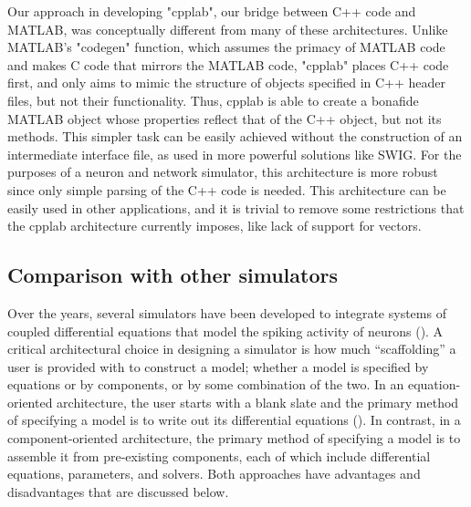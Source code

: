 \documentclass{frontiersSCNS} %
\begin{document}
\begin{tcolorbox}[breakable,notitle,boxrule=0pt,colback=yellow,colframe=yellow]

Our approach in developing "cpplab", our bridge between C++ code and MATLAB, was conceptually different from many of these architectures. Unlike MATLAB's "codegen" function, which assumes the primacy of MATLAB code and makes C code that mirrors the MATLAB code, "cpplab" places C++ code first, and only aims to mimic the structure of objects specified in C++ header files, but not their functionality. Thus, cpplab is able to create a bonafide MATLAB object whose properties reflect that of the C++ object, but not its methods. This simpler task can be easily achieved without the construction of an intermediate interface file, as used in more powerful solutions like SWIG. For the purposes of a neuron and network simulator, this architecture is more robust since only simple parsing of the C++ code is needed. This architecture can be easily used in other applications, and it is trivial to remove some restrictions that the cpplab architecture currently imposes, like lack of support for vectors.

\end{tcolorbox}

\subsection{Comparison with other simulators}

Over the years, several simulators have been developed to integrate systems of coupled differential equations that model the spiking activity of neurons (\cite{bretteSimulationNetworksSpiking2007, sherfeyDynaSimMATLABToolbox2018, vitayANNarchyCodeGeneration2015, delormeSpikeNETEventdrivenSimulation2003, hinesNEURONSimulationEnvironment1997, bower2003genesis}). A critical architectural choice in designing a simulator is how much ``scaffolding'' a user is provided with to construct a model; whether a model is specified by equations or by components, or by some combination of the two. In an equation-oriented architecture, the user starts with a blank slate and the primary method of specifying a model is to write out its differential equations (\cite{stimberg2014equation}). In contrast, in a component-oriented architecture, the primary method of specifying a model is to assemble it from pre-existing components, each of which include differential equations, parameters, and solvers. Both approaches have advantages and disadvantages that are discussed below.
\end{document}
